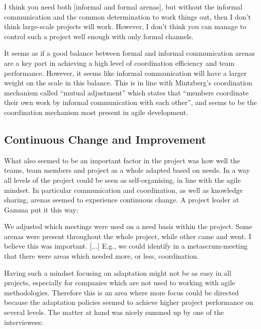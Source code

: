 \begin{fancyquotes}
I think you need both [informal and formal arenas], but without the informal communication and the common determination to work things out, then I don't think large-scale projects will work. However, I don't think you can manage to control such a project well enough with only formal channels.
\end{fancyquotes}

It seems as if a good balance between formal and informal communication arenas are a key part in achieving a high level of coordination efficiency and team performance. However, it seems like informal communication will have a larger weight on the scale in this balance. This is in line with Mintzberg's \cite{mintzberg1989mintzberg} coordination mechanism called ``mutual adjustment'' which states that ``members coordinate their own work by informal communication with each other'', and seems to be the coordination mechanism most present in agile development.

\subsection{Continuous Change and Improvement}

What also seemed to be an important factor in the project was how well the teams, team members and project as a whole adapted based on needs. In a way all levels of the project could be seen as self-organising, in line with the agile mindset. In particular communication and coordination, as well as knowledge sharing, arenas seemed to experience continuous change. A project leader at Gamma put it this way:

\begin{fancyquotes}
We adjusted which meetings were used on a need basis within the project. Some arenas were present throughout the whole project, while other came and went. I believe this was important. [...] E.g., we could identify in a metascrum-meeting that there were areas which needed more, or less, coordination.
\end{fancyquotes}

Having such a mindset focusing on adaptation might not be as easy in all projects, especially for companies which are not used to working with agile methodologies. Therefore this is an area where more focus could be directed because the adaptation policies seemed to achieve higher project performance on several levels. The matter at hand was nicely summed up by one of the interviewees:

